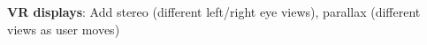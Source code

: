 \documentclass[9pt,landscape]{extarticle}
\begin{document}
\begin{multicols}{3}
\textbf{VR displays}: Add stereo (different left/right eye views), parallax (different views as user moves)


%
%
%
%
%
%
%


\end{multicols}
\end{document}
